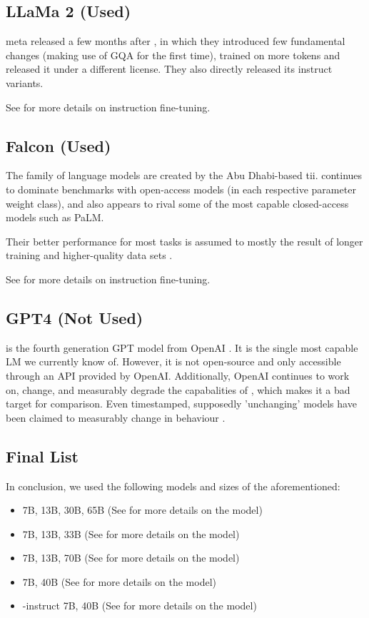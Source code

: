 \subsection{LLaMa 2 (Used)}\label{sub:llama2}
\gls{meta} released  a few months after , in which they introduced few fundamental changes (making use of \gls{GQA} for the first time), trained on more tokens and released it under a different license. They also directly released its instruct variants.

See  for more details on instruction fine-tuning.

\subsection{Falcon (Used)}\label{sub:falcon}
The  \cite{zxhang_falcon_2023} family of language models are created by the Abu Dhabi-based \gls{tii}.
 continues to dominate benchmarks with open-access models (in each respective parameter weight class), and also appears to rival some of the most capable closed-access models such as \gls{PaLM}.

Their better performance for most tasks is assumed to mostly the result of longer training and higher-quality data sets \cite{zxhang_falcon_2023}.

See  for more details on instruction fine-tuning.

\subsection{GPT4 (Not Used)}\label{sub:GPT4}
 is the fourth generation \gls{GPT} model from \gls{OpenAI} \cite{openai_gpt4_2023}.
It is the single most capable \acrlong{LM} we currently know of.
However, it is not open-source and only accessible through an API provided by \gls{OpenAI}.
Additionally, \gls{OpenAI} continues to work on, change, and measurably degrade the capabalities \cite{chen_how_2023} of , which makes it a bad target for comparison.
Even timestamped, supposedly 'unchanging' models have been claimed to measurably change in behaviour \cite{jw1224_hn}.

\subsection{Final List}\label{sub:list}
In conclusion, we used the following models and sizes of the aforementioned:
\begin{itemize}
    \item {} 7B, 13B, 30B, 65B (See  for more details on the model)
    \item {} 7B, 13B, 33B (See  for more details on the model)
    \item {} 7B, 13B, 70B (See  for more details on the model)
    \item {} 7B, 40B (See  for more details on the model)
    \item {}-instruct 7B, 40B (See  for more details on the model)
\end{itemize}
